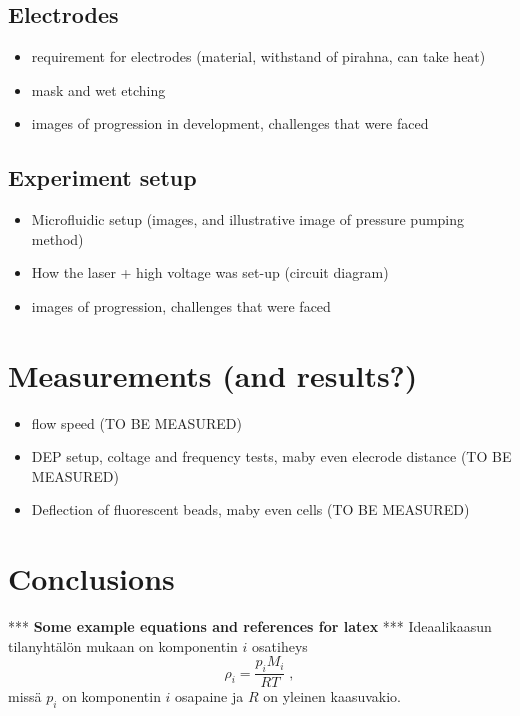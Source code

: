 \documentclass[final]{jyflluk}
\begin{document}
\subsection{Electrodes}
\label{sec:xxx4}
\begin{itemize}
    \item requirement for electrodes (material, withstand of pirahna, can take heat)
    \item mask and wet etching
    \item images of progression in development, challenges that were faced
\end{itemize}

\subsection{Experiment setup}
\label{sec:xxx5}
\begin{itemize}
    \item Microfluidic setup (images, and illustrative image of pressure pumping method)
    \item How the laser + high voltage was set-up (circuit diagram)
    \item images of progression, challenges that were faced
\end{itemize}



\section{Measurements (and results?)}
\label{sec:results}
\begin{itemize}
    \item flow speed (TO BE MEASURED)
    \item DEP setup, coltage and frequency tests, maby even elecrode distance (TO BE MEASURED)
    \item Deflection of fluorescent beads, maby even cells (TO BE MEASURED)
\end{itemize}


\section{Conclusions}
\label{sec:conclusions}

*** \textbf{Some example equations and references for latex} ***
\newline
Ideaalikaasun tilanyhtälön mukaan on komponentin $i$ osatiheys
%
\begin{equation}
   \label{eq:ideaalikaasun-tilanyhtalo}
   \rho_i = \frac{p_i M_i}{R T}\;,
\end{equation}
%
missä $p_i$ on komponentin $i$ osapaine ja $R$ on yleinen kaasuvakio. 
\end{document}
